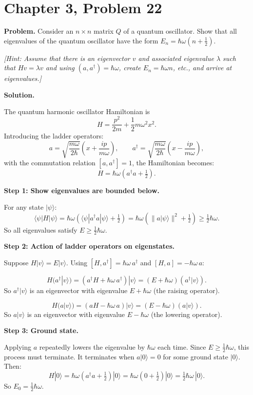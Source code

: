 \documentclass[12pt]{article}
\begin{document}
\section*{Chapter 3, Problem 22}

\textbf{Problem.} Consider an $n \times n$ matrix $Q$ of a quantum oscillator. Show that all eigenvalues of the quantum oscillator have the form $E_n = \hbar\omega(n + \tfrac{1}{2})$.

\textit{[Hint: Assume that there is an eigenvector $v$ and associated eigenvalue $\lambda$ such that $Hv = \lambda v$ and using $(a, a^\dagger) = \hbar\omega$, create $E_n = \hbar\omega n$, etc., and arrive at eigenvalues.]}

\bigskip
\textbf{Solution.}

The quantum harmonic oscillator Hamiltonian is
\[
H = \frac{p^2}{2m} + \frac{1}{2}m\omega^2 x^2.
\]
Introducing the ladder operators:
\[
a = \sqrt{\frac{m\omega}{2\hbar}}\left(x + \frac{ip}{m\omega}\right), \qquad a^\dagger = \sqrt{\frac{m\omega}{2\hbar}}\left(x - \frac{ip}{m\omega}\right),
\]
with the commutation relation $[a, a^\dagger] = 1$, the Hamiltonian becomes:
\[
H = \hbar\omega\left(a^\dagger a + \tfrac{1}{2}\right).
\]

\textbf{Step 1: Show eigenvalues are bounded below.}

For any state $|\psi\rangle$:
\[
\langle \psi | H | \psi \rangle = \hbar\omega\left(\langle \psi | a^\dagger a | \psi \rangle + \tfrac{1}{2}\right) = \hbar\omega\left(\|a|\psi\rangle\|^2 + \tfrac{1}{2}\right) \ge \tfrac{1}{2}\hbar\omega.
\]
So all eigenvalues satisfy $E \ge \tfrac{1}{2}\hbar\omega$.

\textbf{Step 2: Action of ladder operators on eigenstates.}

Suppose $H|v\rangle = E|v\rangle$. Using $[H, a^\dagger] = \hbar\omega\, a^\dagger$ and $[H, a] = -\hbar\omega\, a$:

\[
H(a^\dagger|v\rangle) = (a^\dagger H + \hbar\omega\, a^\dagger)|v\rangle = (E + \hbar\omega)(a^\dagger|v\rangle).
\]
So $a^\dagger|v\rangle$ is an eigenvector with eigenvalue $E + \hbar\omega$ (the raising operator).

\[
H(a|v\rangle) = (aH - \hbar\omega\, a)|v\rangle = (E - \hbar\omega)(a|v\rangle).
\]
So $a|v\rangle$ is an eigenvector with eigenvalue $E - \hbar\omega$ (the lowering operator).

\textbf{Step 3: Ground state.}

Applying $a$ repeatedly lowers the eigenvalue by $\hbar\omega$ each time. Since $E \ge \tfrac{1}{2}\hbar\omega$, this process must terminate. It terminates when $a|0\rangle = 0$ for some ground state $|0\rangle$. Then:
\[
H|0\rangle = \hbar\omega\left(a^\dagger a + \tfrac{1}{2}\right)|0\rangle = \hbar\omega\left(0 + \tfrac{1}{2}\right)|0\rangle = \tfrac{1}{2}\hbar\omega\,|0\rangle.
\]
So $E_0 = \tfrac{1}{2}\hbar\omega$.
\end{document}
